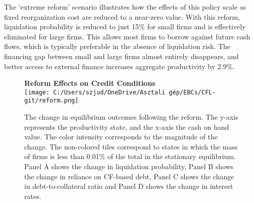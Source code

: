 \documentclass[12pt]{article}
\begin{document}
\noindent The `extreme reform' scenario illustrates how the effects of this policy scale as fixed reorganization cost are reduced to a near-zero value. With this reform, liquidation probability is reduced to just 15\% for small firms and is effectively eliminated for large firms. This allows most firms to borrow against future cash flows, which is typically preferable in the absence of liquidation risk. The financing gap between small and large firms almost entirely disappears, and better access to external finance increases aggregate productivity by 2.9\%. \\

\begin{figure}[H]
    \centering  
    \textbf{\large Reform Effects on Credit Conditions \vspace{2mm}} \\  %
    \vspace{2mm}  %
    \texttt{[image: C:/Users/szjud/OneDrive/Asztali gép/EBCs/CFL-git/reform.png]}
    \caption{\small The change in equilibrium outcomes following the reform. The y-axis represents the productivity state, and the x-axis the cash on hand value. The color intensity corresponds to the magnitude of the change. The non-colored tiles correspond to states in which the mass of firms is less than 0.01\% of the total in the stationary equilibrium. Panel A shows the change in liquidation probability, Panel B shows the change in reliance on CF-based debt, Panel C shows the change in debt-to-collateral ratio and Panel D shows the change in interest rates. }
    \label{chart:poleffects}
\end{figure}
\end{document}
